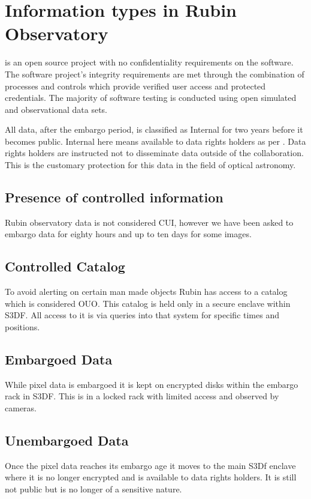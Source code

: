 \section{Information types in Rubin Observatory} \label{sec:infotypes}

\VRO is an open source project with no confidentiality requirements on the software.
The software project’s integrity requirements are met through the combination of
processes and controls which provide verified user access and protected credentials.
The majority of software testing is conducted using open simulated and observational data sets.

All data, after the embargo period,  is classified as Internal for two years before it becomes public.
Internal here means available to data rights holders as per .
Data rights holders are instructed not to disseminate data outside of the collaboration.
This is the customary protection for this data in the field of optical astronomy.

\subsection{Presence of controlled information}\label{sec:cui}
Rubin observatory data is not considered \gls{CUI}, however we have been asked to embargo data for eighty hours and up to ten days for some images.

\subsection{Controlled Catalog}\label{sec:controllescat}
To avoid alerting on certain man made objects Rubin has access to a catalog which is considered \gls{OUO}.
This catalog is held only in a secure enclave within S3DF.
All access to it is via queries into that system for specific times and positions.

\subsection{Embargoed Data} \label{sec:embargo}
While pixel data is embargoed it is kept on encrypted disks within the embargo rack in S3DF.
This is in a locked rack with limited access and observed by cameras.

\subsection{Unembargoed Data}
Once the pixel data reaches its embargo age it moves to the main S3Df enclave where it is no longer encrypted and is available to data rights holders. It is still not public but is no longer of a sensitive nature.

